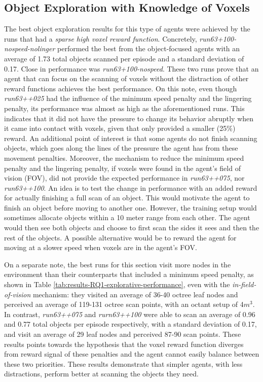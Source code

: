     \subsection{Object Exploration with Knowledge of Voxels} 
        The best object exploration results for this type of agents were achieved by the runs that had a \textit{sparse high voxel reward function}. %
        Concretely, \textit{run63+100-nospeed-nolinger} performed the best from the object-focused agents with an average of 1.73 total objects scanned per episode and a standard deviation of 0.17. Close in performance was \textit{run63+100-nospeed}. These two runs prove that an agent that can focus on the scanning of voxels without the distraction of other reward functions achieves the best performance. On this note, even though \textit{run63++025} had the influence of the minimum speed penalty and the lingering penalty, its performance was almost as high as the aforementioned runs. This indicates that it did not have the pressure to change its behavior abruptly when it came into contact with voxels, given that only provided a smaller (25\%) reward.
        An additional point of interest is that some agents do not finish scanning objects, which goes along the lines of the pressure the agent has from these movement penalties. 
        Moreover, the mechanism to reduce the minimum speed penalty and the lingering penalty, if voxels were found in the agent's field of vision (FOV), did not provide the expected performance in \textit{run63++075}, nor \textit{run63++100}.
        An idea is to test the change in performance with an added reward for actually finishing a full scan of an object. This would motivate the agent to finish an object before moving to another one. However, the training setup would sometimes allocate objects within a 10 meter range from each other. The agent would then see both objects and choose to first scan the sides it sees and then the rest of the objects. A possible alternative would be to reward the agent for moving at a slower speed when voxels are in the agent's FOV.
       

    
    
        On a separate note, the best runs for this section visit more nodes in the environment than their counterparts that included a minimum speed penalty, as shown in Table \ref{tab:results-RQ1-explorative-performance}, even with the \textit{in-field-of-vision} mechanism: they visited an average of 36-40 octree leaf nodes and perceived an average of 119-131 octree scan points, with an octant setup of 4$m^3$.
        In contrast, \textit{run63++075} and \textit{rurn63++100} were able to scan an average of 0.96 and 0.77 total objects per episode respectively, with a standard deviation of 0.17, and visit an average of 29 leaf nodes and perceived 87-90 scan points. 
        These results points towards the hypothesis that the voxel reward function diverges from reward signal of these penalties and the agent cannot easily balance between these two priorities.  
        These results demonstrate that simpler agents, with less distractions, perform better at scanning the objects they need. 
        
